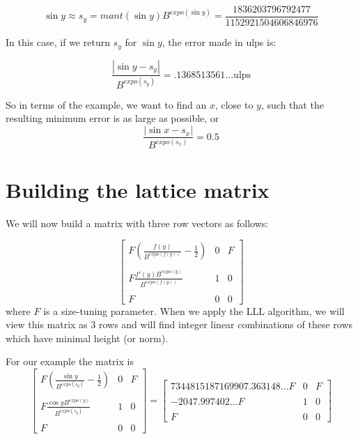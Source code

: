 \documentclass{article}
\begin{document}
\[ \sin y \approx s_y = mant( \sin y ) B^{expo( \sin y )} =
 \frac{1836203796792477}{1152921504606846976} \]

In this case, if we return $s_y$ for $\sin y$, the error made in
ulps is:

\[ \frac{ | \sin y - s_y |  } { B^{expo(s_y)}} = .1368513561... \mbox{ulps} \]

So in terms of the example, we want to find an $x$, close to $y$,
such that the resulting minimum error is as large as possible, or
 \[ \frac{ | \sin x - s_x |  } { B^{expo(s_x)}} = 0.5 \]


\section{Building the lattice matrix}
We will now build a matrix with three row vectors as follows:

\[ \left [ \begin{array}{ccc}
  F \left ( \frac{ f(y) }{B^{expo(f(y))}} - \frac{1}{2} \right ) & 0 & F \\ \\
  F \frac{ f'(y) B^{expo(y)}} {B^{expo(f(y))}} & 1 & 0 \\ \\
  F & 0 & 0
\end{array} \right ] \]
where $F$ is a size-tuning parameter.
When we apply the LLL algorithm, we will view this matrix as 3 rows and
will find integer linear combinations of these rows which have minimal
height (or norm).

For our example the matrix is
\[ \left [ \begin{array}{ccc}
  F \left ( \frac{ \sin y }{B^{expo(s_y)}} - \frac{1}{2} \right ) & 0 & F \\ \\
  F \frac{ \cos y B^{expo(y)}} {B^{expo(s_y)}} & 1 & 0 \\ \\
  F & 0 & 0
\end{array} \right ] =
\left [ \begin{array}{ccc}
 7344815187169907.363148... F & 0 & F \\ \\
 -2047.997402... F & 1 & 0 \\ \\
 F & 0 & 0
\end{array} \right ] \]
\end{document}
